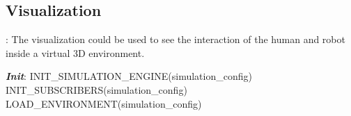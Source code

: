 \subsection{Visualization}: The visualization could be used to see the interaction of the human and robot inside a virtual 3D environment.
\begin{algorithm}
 \textbf{\emph{Init}}:\;
 \quad INIT\_SIMULATION\_ENGINE(simulation\_config) \;
 \quad INIT\_SUBSCRIBERS(simulation\_config) \;
 \quad LOAD\_ENVIRONMENT(simulation\_config) \; 
\end{algorithm}


